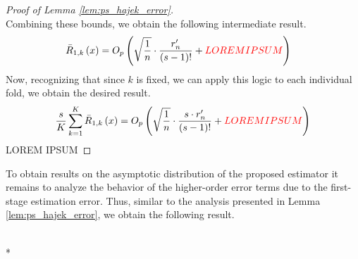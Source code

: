 \begin{proof}[Proof of Lemma \ref{lem:ps_hajek_error}]
\begin{equation}
    \end{equation}
    Combining these bounds, we obtain the following intermediate result.
    \begin{equation}
        \begin{aligned}
            \bar{R}_{1, k}\left(x\right)
            & = O_{p}\left(\sqrt{\frac{1}{n}} \cdot \frac{r_{n}^{\prime}}{(s-1)!} + {\color{red} LOREM IPSUM}\right)
        \end{aligned}
    \end{equation}
    Now, recognizing that since $k$ is fixed, we can apply this logic to each individual fold, we obtain the desired result.
    \begin{equation}
        \begin{aligned}
            \frac{s}{K} \sum_{k = 1}^{K} \bar{R}_{1, k}\left(x\right) 
            = O_{p}\left(\sqrt{\frac{1}{n}} \cdot \frac{s \cdot r_{n}^{\prime}}{(s-1)!} + {\color{red} LOREM IPSUM}\right)
        \end{aligned}
    \end{equation}
{\color{red} LOREM IPSUM}
\end{proof}

\newpage

To obtain results on the asymptotic distribution of the proposed estimator it remains to analyze the behavior of the higher-order error terms due to the first-stage estimation error.
Thus, similar to the analysis presented in Lemma \ref{lem:ps_hajek_error}, we obtain the following result.

\begin{lem}\label{lem:HO_error}\mbox{}\\*
    
\end{lem}

